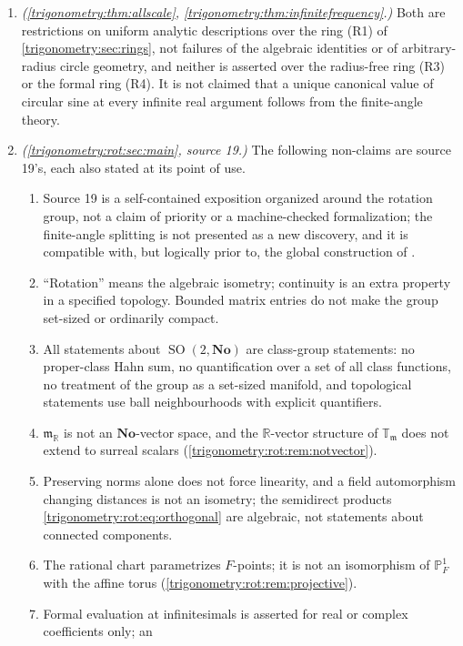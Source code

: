 \documentclass[11pt,letterpaper]{article}
\numberwithin{equation}{section}
\theoremstyle{definition}
\theoremstyle{remark}
\newcommand{\No}{\mathbf{No}}
\newcommand{\R}{\mathbb R}
\newcommand{\mm}{\mathfrak m}
\newcommand{\TT}{\mathbb T}
\newcommand{\PP}{\mathbb P}
\newcommand{\SO}{\operatorname{SO}}
\newcommand{\Tm}{\TT_{\mm}}
\begin{document}
\begin{enumerate}
 follow that
 defining a full-plane convention is impossible: the trivial-character convention is perfectly
 explicit. What fails is uniqueness from the stated analytic and algebraic axioms.
\item \emph{(\cref{trigonometry:thm:allscale}, \cref{trigonometry:thm:infinitefrequency}.)} Both
 are restrictions on uniform analytic descriptions over the ring (R1) of
 \cref{trigonometry:sec:rings}, not failures of the algebraic identities or of arbitrary-radius
 circle geometry, and neither is asserted over the radius-free ring (R3) or the formal ring (R4).
 It is not claimed that a unique canonical value of circular sine at every infinite real argument
 follows from the finite-angle theory.
\item \emph{(\cref{trigonometry:rot:sec:main}, source 19.)} The following non-claims are source 19's,
 each also stated at its point of use.
 \begin{enumerate}[label=(\alph*),itemsep=0.2em]
 \item Source 19 is a self-contained exposition organized around the rotation group, not a claim of
  priority or a machine-checked formalization; the finite-angle splitting is not presented as a new
  discovery, and it is compatible with, but logically prior to, the global construction of
  \cite[\S11]{EK}.
 \item ``Rotation'' means the algebraic isometry; continuity is an extra property in a specified
  topology. Bounded matrix entries do not make the group set-sized or ordinarily compact.
 \item All statements about $\SO(2,\No)$ are class-group statements: no proper-class Hahn sum, no
  quantification over a set of all class functions, no treatment of the group as a set-sized
  manifold, and topological statements use ball neighbourhoods with explicit quantifiers.
 \item $\mm_{\R}$ is not an $\No$-vector space, and the $\R$-vector structure of $\Tm$ does not extend
  to surreal scalars (\cref{trigonometry:rot:rem:notvector}).
 \item Preserving norms alone does not force linearity, and a field automorphism changing distances
  is not an isometry; the semidirect products \cref{trigonometry:rot:eq:orthogonal} are algebraic, not
  statements about connected components.
 \item The rational chart parametrizes $F$-points; it is not an isomorphism of $\PP^1_F$ with the
  affine torus (\cref{trigonometry:rot:rem:projective}).
 \item Formal evaluation at infinitesimals is asserted for real or complex coefficients only; an

\end{enumerate}
\end{enumerate}
\end{document}
